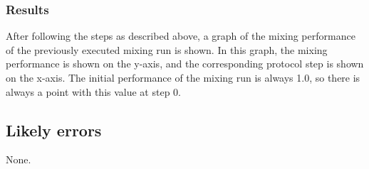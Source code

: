 \subsubsection{Results}
After following the steps as described above, a graph of the mixing performance of the previously executed mixing run is shown. In this graph, the mixing performance is shown on the y-axis, and the corresponding protocol step is shown on the x-axis. The initial performance of the mixing run is always 1.0, so there is always a point with this value at step 0.

\subsection{Likely errors}
None.